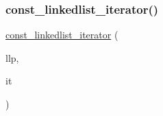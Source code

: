 \subsubsection{\texorpdfstring{const\+\_\+linkedlist\+\_\+iterator()}{const\_linkedlist\_iterator()}\hspace{0.1cm}{\footnotesize\ttfamily [3/3]}}
{\footnotesize\ttfamily \mbox{\hyperlink{classLinkedList_1_1const__linkedlist__iterator}{const\+\_\+linkedlist\+\_\+iterator}} (\begin{DoxyParamCaption}\item[{const \mbox{\hyperlink{classLinkedList}{Linked\+List}} $\ast$}]{llp,  }\item[{const typename std\+::list$<$ Value\+Type $>$\+::const\+\_\+iterator \&}]{it }\end{DoxyParamCaption})\hspace{0.3cm}{\ttfamily [inline]}}

